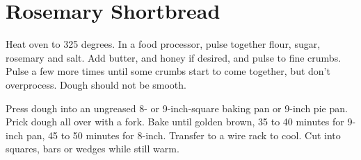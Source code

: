\section{Rosemary Shortbread}
\begin{recipe}
	
	
	
	
	Heat oven to 325 degrees. In a food processor, pulse together flour, sugar, rosemary and salt. Add butter, and honey if desired, and pulse to fine crumbs. Pulse a few more times until some crumbs start to come together, but don't overprocess. Dough should not be smooth.
	
	Press dough into an ungreased 8- or 9-inch-square baking pan or 9-inch pie pan. Prick dough all over with a fork. Bake until golden brown, 35 to 40 minutes for 9-inch pan, 45 to 50 minutes for 8-inch. Transfer to a wire rack to cool. Cut into squares, bars or wedges while still warm.
	
	
	
\end{recipe}
